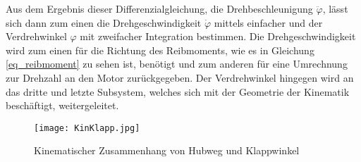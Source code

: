 Aus dem Ergebnis dieser Differenzialgleichung, die Drehbeschleunigung $\ddot{\varphi}$, lässt sich dann zum einen die Drehgeschwindigkeit $\dot{\varphi}$ mittels einfacher und der Verdrehwinkel $\varphi$ mit zweifacher Integration bestimmen. Die Drehgeschwindigkeit wird zum einen für die Richtung des Reibmoments, wie es in Gleichung \ref{eq_reibmoment} zu sehen ist, benötigt und zum anderen für eine Umrechnung zur Drehzahl an den Motor zurückgegeben. Der Verdrehwinkel hingegen wird an das dritte und letzte Subsystem, welches sich mit der Geometrie der Kinematik beschäftigt, weitergeleitet.
\begin{figure}[h] 
	\centering
	\texttt{[image: KinKlapp.jpg]}
	\caption{Kinematischer Zusammenhang von Hubweg und Klappwinkel}
	\label{abb_kinklapp}
\end{figure}\\

